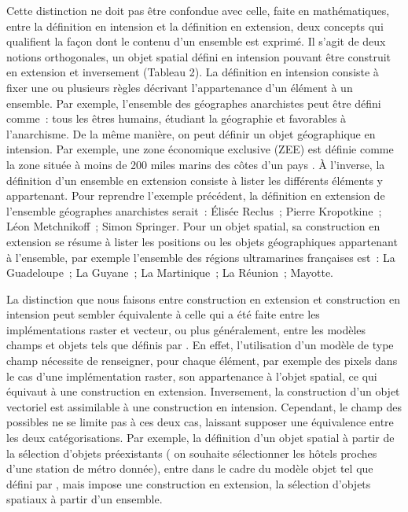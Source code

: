 Cette distinction ne doit pas être confondue avec celle, faite en
mathématiques, entre la définition en intension et la définition en
extension, deux concepts qui qualifient la façon dont le contenu d’un
ensemble est exprimé. Il s’agit de deux notions orthogonales, un objet
spatial défini en intension pouvant être construit en extension et
inversement (Tableau 2). La définition en intension consiste à fixer
une ou plusieurs règles décrivant l’appartenance d’un élément à un
ensemble. Par exemple, l’ensemble des géographes anarchistes peut être
défini comme : tous les êtres humains, étudiant la géographie et
favorables à l’anarchisme. De la même manière, on peut définir un
objet géographique en intension. Par exemple, une zone économique
exclusive (ZEE) est définie comme la zone située à moins de 200 miles
marins des côtes d’un pays \autocite{Brunet1992}. À l’inverse, la
définition d’un ensemble en extension consiste à lister les différents
éléments y appartenant. Pour reprendre l’exemple précédent, la
définition en extension de l’ensemble géographes anarchistes serait :
Élisée Reclus ; Pierre Kropotkine ; Léon Metchnikoff ; Simon
Springer. Pour un objet spatial, sa construction en extension se
résume à lister les positions ou les objets géographiques appartenant
à l’ensemble, par exemple l’ensemble des régions ultramarines
françaises est : La Guadeloupe ; La Guyane ; La Martinique ; La
Réunion ; Mayotte.

La distinction que nous faisons entre construction en extension et
construction en intension peut sembler équivalente à celle qui a été
faite entre les implémentations raster et vecteur, ou plus
généralement, entre les modèles champs et objets tels que définis par
\textcite{Couclelis1992,Goodchild1992}. En effet, l’utilisation d’un
modèle de type champ nécessite de renseigner, pour chaque élément, par
exemple des pixels dans le cas d’une implémentation raster, son
appartenance à l’objet spatial, ce qui équivaut à une construction en
extension. Inversement, la construction d’un objet vectoriel est
assimilable à une construction en intension. Cependant, le champ des
possibles ne se limite pas à ces deux cas, laissant supposer une
équivalence entre les deux catégorisations. Par exemple, la définition
d’un objet spatial à partir de la sélection d’objets préexistants (\eg
on souhaite sélectionner les hôtels proches d’une station de métro
donnée), entre dans le cadre du modèle objet tel que défini par
\textcite{Couclelis1992}, mais impose une construction en extension,
\ie la sélection d’objets spatiaux à partir d’un ensemble.

